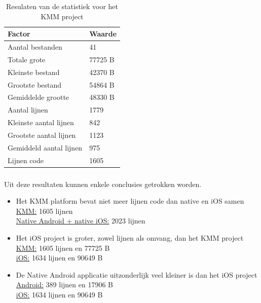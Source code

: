 \begin{table}[H]
    \centering
    \caption{Resulaten van de statistiek voor het KMM project}
    \begin{tabular}{|l|l|}
        \hline
        {\textbf{Factor}} & {\textbf{Waarde}} \\ \hline \hline
        Aantal bestanden&41\\ \hline
        Totale grote&77725 B\\ \hline
        Kleinste bestand&42370 B\\ \hline
        Grootste bestand&54864 B\\ \hline
        Gemiddelde grootte&48330 B\\ \hline
        Aantal lijnen&1779\\ \hline
        Kleinste aantal lijnen&842\\ \hline
        Grootste aantal lijnen&1123\\ \hline
        Gemiddeld aantal lijnen&975\\ \hline
        Lijnen code&1605\\ \hline
    \end{tabular}
    \label{T:lines-kmm}
\end{table}

\subsubsection{}
\label{sec:M-test-lijnen-code-conclusion}
Uit deze resultaten kunnen enkele conclusies getrokken worden.
\begin{itemize}
    \item Het KMM platform bevat niet meer lijnen code dan native en iOS samen\\
    \underline{KMM:} 1605 lijnen\\
    \underline{Native Android + native iOS:} 2023 lijnen\\
    \item Het iOS project is groter, zowel lijnen als omvang, dan het KMM project\\
    \underline{KMM:} 1605 lijnen en 77725 B\\
    \underline{iOS:} 1634 lijnen en 90649 B\\
    \item De Native Android applicatie uitzonderlijk veel kleiner is dan het iOS project\\
    \underline{Android:} 389 lijnen en 17906 B\\
    \underline{iOS:} 1634 lijnen en 90649 B
\end{itemize}

